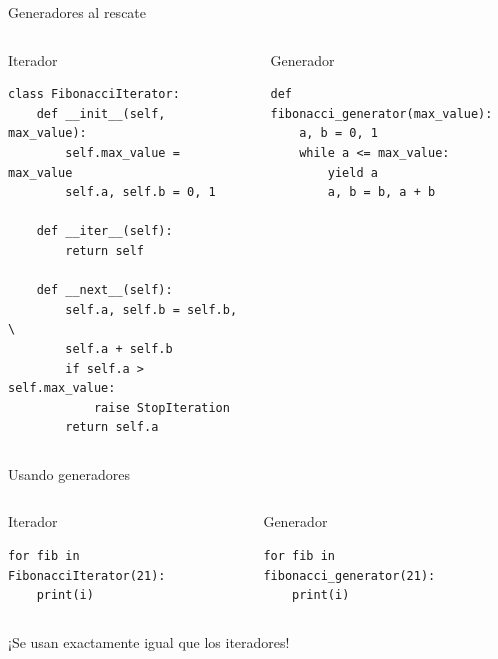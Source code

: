 \documentclass[11pt]{beamer}
\begin{document}
\begin{frame}[fragile]{Generadores al rescate}
\begin{columns}[T]

\begin{column}{.45\textwidth}
\begin{block}{Iterador}
\begin{verbatim}
class FibonacciIterator:
    def __init__(self, max_value):
        self.max_value = max_value
        self.a, self.b = 0, 1

    def __iter__(self):
        return self

    def __next__(self):
        self.a, self.b = self.b, \
        self.a + self.b
        if self.a > self.max_value:
            raise StopIteration
        return self.a
\end{verbatim}
\end{block} 
\end{column}

\begin{column}{.45\textwidth}
\begin{block}{Generador}
\begin{verbatim}
def fibonacci_generator(max_value):
    a, b = 0, 1
    while a <= max_value:
        yield a
        a, b = b, a + b
\end{verbatim}
\end{block}
\end{column}

\end{columns}
\end{frame}

\begin{frame}[fragile]{Usando generadores}
\begin{columns}[T]

\begin{column}{.45\textwidth}
\begin{block}{Iterador}
\begin{verbatim}
for fib in FibonacciIterator(21):
    print(i)
\end{verbatim}
\end{block} 
\end{column}

\begin{column}{.45\textwidth}
\begin{block}{Generador}
\begin{verbatim}
for fib in fibonacci_generator(21):
    print(i)
\end{verbatim}
\end{block}
\end{column}
  
\end{columns} 

\begin{center}
    ¡Se usan exactamente igual que los iteradores!
\end{center}
\end{frame}
\end{document}
